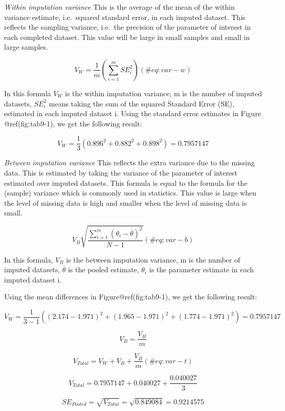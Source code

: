 \documentclass[
]{book}
\begin{document}
\emph{Within imputation variance} This is the average of the mean of the
within variance estimate, i.e.~squared standard error, in each imputed
dataset. This reflects the sampling variance, i.e.~the precision of the
parameter of interest in each completed dataset. This value will be
large in small samples and small in large samples.

\begin{equation}
V_W = \frac{1}{m}\left (\sum_{i=1}^m{SE_i^2}\right )
  (\#eq:var-w)
\end{equation}

In this formula \(V_W\) is the within imputation variance, m is the
number of imputed datasets, \(SE_i^2\) means taking the sum of the
squared Standard Error (SE), estimated in each imputed dataset i. Using
the standard error estimates in Figure @ref(fig:tab9-1), we get the
following result:

\[V_W = \frac{1}{3}(0.896^2 + 0.882^2 + 0.898^2)=0.7957147\]

\emph{Between imputation variance} This reflects the extra variance due
to the missing data. This is estimated by taking the variance of the
parameter of interest estimated over imputed datasets. This formula is
equal to the formula for the (sample) variance which is commonly used in
statistics. This value is large when the level of missing data is high
and smaller when the level of missing data is small.

\begin{equation}
V_B\sqrt{\frac{\sum_{i=1}^m (\theta_i - \overline{\theta})^2}{N-1} }
  (\#eq:var-b)
\end{equation}

In this formula, \(V_B\) is the between imputation variance, m is the
number of imputed datasets, \(\overline{\theta}\) is the pooled
estimate, \(\theta_i\) is the parameter estimate in each imputed dataset
i.

Using the mean differences in Figure@ref(fig:tab9-1), we get the
following result:

\[V_W = \frac{1}{3-1}((2.174-1.971)^2+ (1.965-1.971)^2+(1.774-1.971)^2)=0.7957147\]

\[V_B = \frac{V_B}{m}\]

\begin{equation}
V_{Total} = V_W + V_B + \frac{V_B}{m}
  (\#eq:var-t)
\end{equation}

\[V_{Total} = 0.7957147+0.040027 + \frac{0.040027}{3}\]

\[SE_{Pooled} = \sqrt{V_{Total}} = \sqrt{0.849084} = 0.9214575\]
\end{document}
